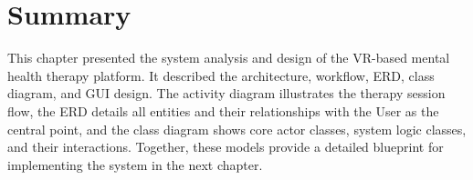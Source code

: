 \section{Summary}
This chapter presented the system analysis and design of the VR-based mental health therapy platform. It described the architecture, workflow, ERD, class diagram, and GUI design. The activity diagram illustrates the therapy session flow, the ERD details all entities and their relationships with the User as the central point, and the class diagram shows core actor classes, system logic classes, and their interactions. Together, these models provide a detailed blueprint for implementing the system in the next chapter.
